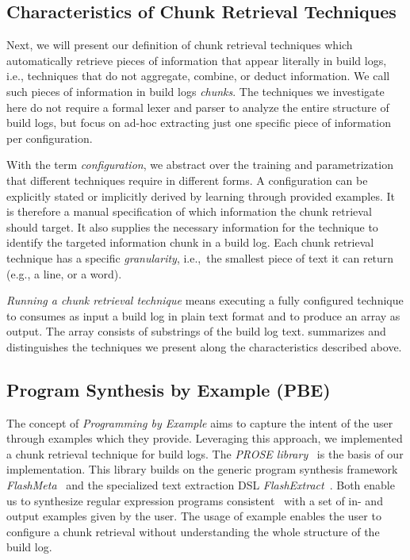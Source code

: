 \subsection{Characteristics of Chunk Retrieval Techniques}
\label{sec:crt-characteristics}
Next, we will present our definition of chunk retrieval techniques
which automatically
retrieve pieces of information that appear literally in build
logs, i.e., techniques that do not aggregate, combine, or deduct
information.
We call such pieces of information in build logs
\emph{chunks}.
The techniques we investigate here do not require a formal lexer and
parser to analyze the entire structure of build logs, but focus on
ad-hoc extracting just one specific piece of information per
configuration.

With the term \textit{configuration}, we abstract over the training
and parametrization that different techniques require in different
forms.
A configuration can be explicitly stated or implicitly derived
by learning through provided examples.
It is therefore a manual
specification of which information the chunk retrieval should target.
It also supplies the necessary information for the technique to
identify the targeted information chunk in a build log.
Each chunk
retrieval technique has a specific \textit{granularity}, i.e.,\ the
smallest piece of text it can return (e.g., a line, or a word).

\emph{Running a
chunk retrieval technique} means executing a fully configured
technique to consumes as input a build log in plain text format and to
produce an array as output.
The array consists of substrings of the
build log text.
 summarizes and distinguishes the techniques
we present along the
characteristics described above.

\subsection{Program Synthesis by Example (PBE)}
The concept of \emph{Programming by Example} aims to capture the
intent of the user through examples which they provide.
Leveraging this approach, we implemented a chunk retrieval technique
for build logs.
The \emph{PROSE library}~\cite{prose2019webpage} is the basis of
our implementation.
This library builds on the generic program synthesis framework
\emph{FlashMeta}~\cite{polozov2015flashmeta:} and the specialized
text extraction DSL \emph{FlashExtract}~\cite{le2014flashextract:}.
Both enable us to synthesize regular expression programs
consistent~\cite{mitchell1982generalization} with a set of in-
and output examples given by the user.
The usage of example enables the user to configure a chunk
retrieval without understanding the whole structure of
the build log.

